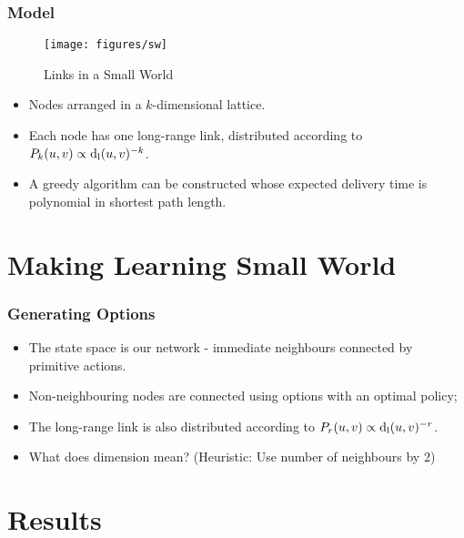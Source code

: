 \documentclass{beamer}
\begin{document}
\begin{frame}
    \frametitle{Model}
    \label{frame:small-worlds-decentralised}
     
    \begin{figure}[h]
        \centering
        \texttt{[image: figures/sw]}
        \label{fig:small-world}
        \caption{Links in a Small World}
    \end{figure}

    \begin{itemize}
            \item Nodes arranged in a $k$-dimensional lattice.
            \item Each node has one long-range link, distributed according to
                $P_{k}( u, v ) \propto \operatorname{d_l}(u,v)^{-k}$.
            \pause 
            \item A greedy algorithm can be constructed whose expected delivery
                time is polynomial in shortest path length.
    \end{itemize}

\end{frame}

\section{Making Learning Small World}
\label{sec:swoptions}

\begin{frame}
    \frametitle{Generating Options}
    \label{frame:swoptions-options}
    \begin{itemize}
            \item The state space is our network - immediate neighbours
                connected by primitive actions.
            \item Non-neighbouring nodes are connected using options with an
                optimal policy; 
            \item The long-range link is also distributed according to
                $P_{r}( u, v ) \propto \operatorname{d_l}(u,v)^{-r}$.
            \pause 
            \item What does dimension mean? (Heuristic: Use number of neighbours
                by 2)
    \end{itemize}

\end{frame}

\section{Results}
\end{document}
